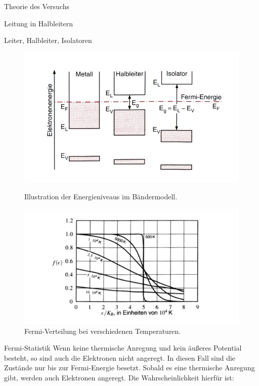 \documentclass[pdftex, a4paper,11pt, twoside, ngerman]{report}
\begin{document}
\begin{chapter}{Theorie des Versuchs}
\begin{section}{Leitung in Halbleitern}
\begin{subsection}{Leiter, Halbleiter, Isolatoren}
            \begin{figure}[ht!]
              \centering
              \begin{minipage}{.49\textwidth}
                \centering
                \includegraphics[width=\textwidth]{Figures/Baendermodell.png}
                \caption{Illustration der Energieniveaus im Bändermodell.}
                \label{fig:Baendermodell}
              \end{minipage}
              \begin{minipage}{.49\textwidth}
                \centering
                \includegraphics[width=\textwidth]{Figures/Fermi.png}
                \caption{Fermi-Verteilung bei verschiedenen Temperaturen.}
                \label{fig:FermiTemp}
              \end{minipage}
            \end{figure}

        \end{subsection}

        \begin{subsection}{Fermi-Statistik}
            Wenn keine thermische Anregung und kein äußeres Potential besteht, so sind auch die Elektronen nicht angeregt.
            In diesen Fall sind die Zustände nur bis zur Fermi-Energie besetzt.
            Sobald es eine thermische Anregung gibt, werden auch Elektronen angeregt. Die Wahrscheinlichkeit hierfür ist:
            

\end{subsection}
\end{section}
\end{chapter}
\end{document}
